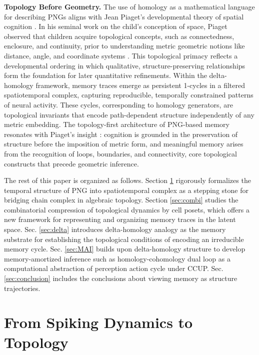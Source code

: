 \documentclass[lettersize,journal]{IEEEtran}
\begin{document}
\noindent\textbf{Topology Before Geometry.} 
The use of homology as a mathematical language for describing PNGs aligns with Jean Piaget's developmental theory of spatial cognition \cite{piaget1952origins}. In his seminal work on the child's conception of space, Piaget observed that children acquire topological concepts, such as connectedness, enclosure, and continuity, prior to understanding metric geometric notions like distance, angle, and coordinate systems \cite{piaget2005psychology}. This topological primacy reflects a developmental ordering in which qualitative, structure-preserving relationships form the foundation for later quantitative refinements. Within the delta-homology framework, memory traces emerge as persistent 1-cycles in a filtered spatiotemporal complex, capturing reproducible, temporally constrained patterns of neural activity. These cycles, corresponding to homology generators, are topological invariants that encode path-dependent structure independently of any metric embedding. The topology-first architecture of PNG-based memory resonates with Piaget’s insight \cite{piaget2013child}: cognition is grounded in the preservation of structure before the imposition of metric form, and meaningful memory arises from the recognition of loops, boundaries, and connectivity, core topological constructs that precede geometric inference.

The rest of this paper is organized as follows. Section \ref{sec:spiking} rigorously formalizes the temporal structure of PNG into spatiotemporal complex as a stepping stone for bridging chain complex in algebraic topology. Section \ref{sec:combi} studies the combinatorial compression of topological dynamics by cell posets, which offers a new framework for representing and organizing memory traces in the latent space. Sec. \ref{sec:delta} introduces delta-homology analogy as the memory substrate for establishing the topological conditions of encoding an irreducible memory cycle. Sec. \ref{sec:MAI} builds upon delta-homology structure to develop memory-amortized inference such as homology-cohomology dual loop as a computational abstraction of perception action cycle under CCUP. Sec. \ref{sec:conclusion} includes the conclusions about viewing memory as structure trajectories.


\section{From Spiking Dynamics to Topology}
\label{sec:spiking}
\end{document}
